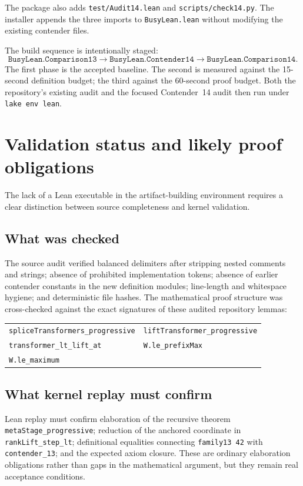 \documentclass[11pt]{article}
\theoremstyle{definition}
\theoremstyle{remark}
\newcommand{\lean}[1]{\texttt{#1}}
\begin{document}
The package also adds \lean{test/Audit14.lean} and
\lean{scripts/check14.py}.  The installer appends the three imports to
\lean{BusyLean.lean} without modifying the existing contender files.

The build sequence is intentionally staged:
\[
\lean{BusyLean.Comparison13}
\longrightarrow
\lean{BusyLean.Contender14}
\longrightarrow
\lean{BusyLean.Comparison14}.
\]
The first phase is the accepted baseline.  The second is measured against the
15-second definition budget; the third against the 60-second proof budget.
Both the repository's existing audit and the focused Contender~14 audit then
run under \lean{lake env lean}.

\section{Validation status and likely proof obligations}

The lack of a Lean executable in the artifact-building environment requires a
clear distinction between source completeness and kernel validation.

\subsection{What was checked}

The source audit verified balanced delimiters after stripping nested comments
and strings; absence of prohibited implementation tokens; absence of earlier
contender constants in the new definition modules; line-length and whitespace
hygiene; and deterministic file hashes.  The mathematical proof structure was
cross-checked against the exact signatures of these audited repository lemmas:
\begin{center}
\begin{tabular}{ll}
\lean{spliceTransformers\_progressive} & \lean{liftTransformer\_progressive}\\
\lean{transformer\_lt\_lift\_at} & \lean{W.le\_prefixMax}\\
\lean{W.le\_maximum} &
\end{tabular}
\end{center}

\subsection{What kernel replay must confirm}

Lean replay must confirm elaboration of the recursive theorem
\lean{metaStage\_progressive}; reduction of the anchored coordinate in
\lean{rankLift\_step\_lt}; definitional equalities connecting
\lean{family13 42} with \lean{contender\_13}; and the expected axiom closure.
These are ordinary elaboration obligations rather than gaps in the mathematical
argument, but they remain real acceptance conditions.
\end{document}
